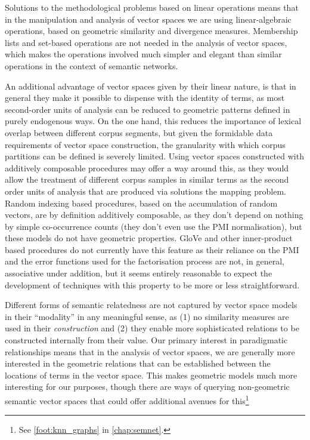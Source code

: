 Solutions to the methodological problems based on linear operations means that in the manipulation and analysis of vector spaces we are using linear-algebraic operations, based on geometric similarity and divergence measures.
Membership lists and set-based operations are not needed in the analysis of vector spaces, which makes the operations involved much simpler and elegant than similar operations in the context of semantic networks.

An additional advantage of vector spaces given by their linear nature, is that in general they make it possible to dispense with the identity of terms, as most second-order units of analysis can be reduced to geometric patterns defined in purely endogenous ways.
On the one hand, this reduces the importance of lexical overlap between different corpus segments, but given the formidable data requirements of vector space construction, the granularity with which corpus partitions can be defined is severely limited.
Using vector spaces constructed with additively composable procedures may offer a way around this, as they would allow the treatment of different corpus samples in similar terms as the second order units of analysis that are produced via solutions the mapping problem.
Random indexing based procedures, based on the accumulation of random vectors, are by definition additively composable, as they don't depend on nothing by simple co-occurrence counts (they don't even use the PMI normalisation), but these models do not have geometric properties.
GloVe and other inner-product based procedures do not currently have this feature as their reliance on the PMI and the error functions used for the factorisation process are not, in general, associative under addition, but it seems entirely reasonable to expect the development of techniques with this property to be more or less straightforward.

Different forms of semantic relatedness are not captured by vector space models in their ``modality'' in any meaningful sense, as (1) no similarity measures are used in their \emph{construction} and (2) they enable more sophisticated relations to be constructed internally from their value.
Our primary interest in paradigmatic relationships means that in the analysis of vector spaces, we are generally more interested in the geometric relations that can be established between the locations of terms in the vector space.
This makes geometric models much more interesting for our purposes, though there are ways of querying non-geometric semantic vector spaces that could offer additional avenues for this\footnote{
    See \autoref{foot:knn_graphs} in \autoref{chap:semnet}.
}


